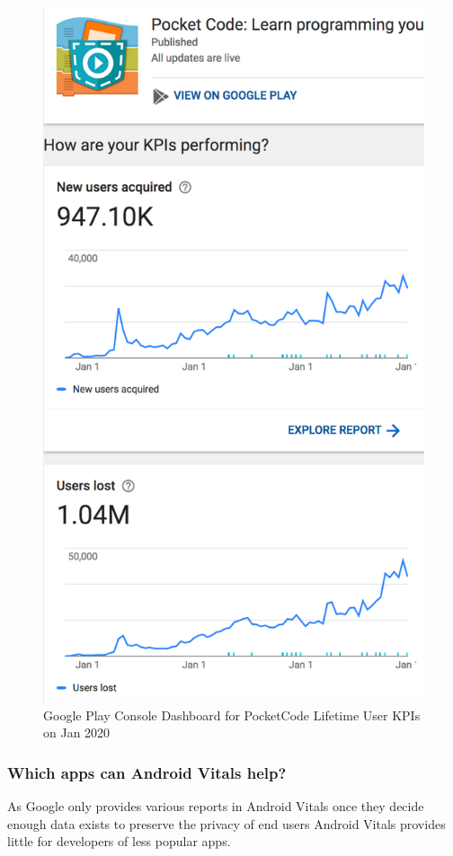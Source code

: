 \begin{figure}
    \centering
    \includegraphics[width=0.75\linewidth]{images/android-vitals-screenshots/catrobat/PocketCode-Lifetime-User-KPIs-2020-jan-24b.pdf}
    \caption{Google Play Console Dashboard for PocketCode Lifetime User KPIs on  Jan 2020}
    \label{fig:PocketCode-Lifetime-User-KPIs-2020-jan-24}
\end{figure}


\subsubsection{Which apps can Android Vitals help?}
As Google only provides various reports in Android Vitals once they decide enough data exists to preserve the privacy of end users Android Vitals provides little for developers of less popular apps. 

